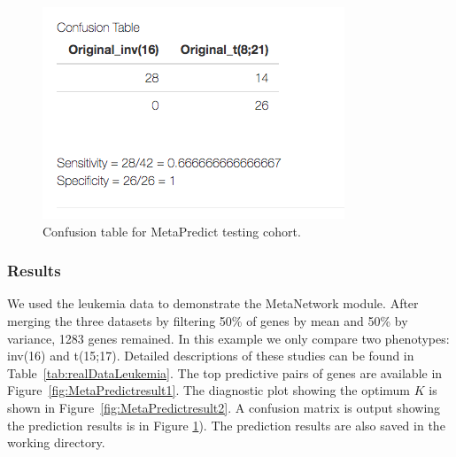 \begin{figure}[H]
\begin{center}
\includegraphics[scale=0.5]{./figure/MetaPredict/MetaPredictresult3.png}
\caption{Confusion table for MetaPredict testing cohort.}
\label{fig:MetaPredictresult3}
\end{center}
\end{figure}

\subsubsection{Results}

We used the leukemia data to demonstrate the MetaNetwork module.
After merging the three datasets by filtering 50\% of genes by mean and 50\% by variance, 1283 genes remained.
In this example we only compare two phenotypes: inv(16) and t(15;17). 
Detailed descriptions of these studies can be found in Table~\ref{tab:realDataLeukemia}. 
The top predictive pairs of genes are available in Figure~\ref{fig:MetaPredictresult1}.
The diagnostic plot showing the optimum $K$ is shown in Figure~\ref{fig:MetaPredictresult2}.
A confusion matrix is output  showing the prediction results is in Figure \ref{fig:MetaPredictresult3}).
The prediction results are also saved in the working directory.

